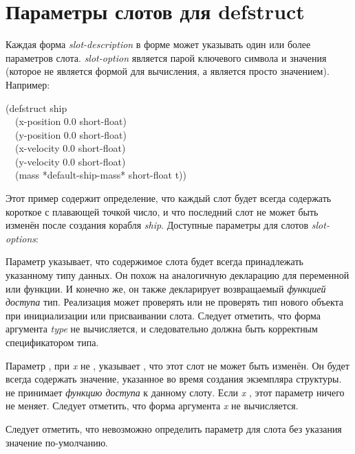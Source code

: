 \section{Параметры слотов для defstruct}
\label{Defstruct-Slot-Options}

Каждая форма \emph{slot-description} в форме  может указывать
один или более параметров слота. \emph{slot-option} является парой ключевого
символа и значения (которое не является формой для вычисления, а является просто
значением).  Например:
\begin{lisp}
(defstruct ship \\
~~(x-position 0.0  short-float) \\
~~(y-position 0.0  short-float) \\
~~(x-velocity 0.0  short-float) \\
~~(y-velocity 0.0  short-float) \\
~~(mass *default-ship-mass*  short-float  t))
\end{lisp}
Этот пример содержит определение, что каждый слот будет всегда содержать
короткое с плавающей точкой число, и что последний слот не может быть изменён
после создания корабля \emph{ship}.
Доступные параметры для слотов \emph{slot-options}:
\begin{flushdesc}
\item[\cd{:type}] Параметр  указывает, что
  содержимое слота будет всегда принадлежать указанному типу
  данных. Он похож на аналогичную декларацию для переменной или
  функции. И конечно же, он также декларирует возвращаемый
  \emph{функцией доступа} тип. Реализация может проверять или не
  проверять тип нового объекта при инициализации или присваивании
  слота.  Следует отметить, что форма аргумента \emph{type} не
  вычисляется, и следовательно должна быть корректным спецификатором
  типа.

\item[\cd{:read-only}] Параметр , при
  \emph{x} не {\false}, указывает , что этот слот не может быть
  изменён. Он будет всегда содержать значение, указанное во время
  создания экземпляра структуры.   не принимает
  \emph{функцию доступа} к данному слоту.  Если \emph{x} {\false},
  этот параметр ничего не меняет.  Следует отметить, что форма
  аргумента \emph{x} не вычисляется.
\end{flushdesc}

Следует отметить, что невозможно определить параметр для слота без указания
значение по-умолчанию.

